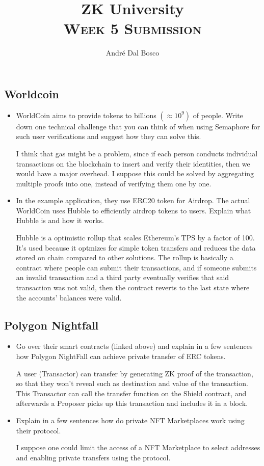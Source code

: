 \documentclass{article}
\title{ZK University \\[4pt] \normalsize\textsc{Week 5 Submission}}
\author{André Dal Bosco \\ \small{\email \quad \discord}}
\begin{document}
\maketitle

\subsection*{Worldcoin}
\begin{itemize}
    \item WorldCoin aims to provide tokens to billions $(\approx\!10^9)$ of people. Write down one technical challenge that you can think of when using Semaphore for such user verifications and suggest how they can solve this. \par I think that gas might be a problem, since if each person conducts individual transactions on the blockchain to insert and verify their identities, then we would have a major overhead. I suppose this could be solved by aggregating multiple proofs into one, instead of verifying them one by one.
    \item In the example application, they use ERC20 token for Airdrop. The actual WorldCoin uses Hubble to efficiently airdrop tokens to users. Explain what Hubble is and how it works. \par Hubble is a optimistic rollup that scales Ethereum's TPS by a factor of 100. It's used because it optmizes for simple token transfers and reduces the data stored on chain compared to other solutions. The rollup is basically a contract where people can submit their transactions, and if someone submits an invalid transaction and a third party eventually verifies that said transaction was not valid, then the contract reverts to the last state where the accounts' balances were valid.
\end{itemize}

\subsection*{Polygon Nightfall}
\begin{itemize}
    \item Go over their smart contracts (linked above) and explain in a few sentences how Polygon NightFall can achieve private transfer of ERC tokens. \par A user (Transactor) can transfer by generating ZK proof of the transaction, so that they won't reveal such as destination and value of the transaction. This Transactor can call the transfer function on the Shield contract, and afterwards a Proposer picks up this transaction and includes it in a block.
    \item Explain in a few sentences how do private NFT Marketplaces work using their protocol. \par I suppose one could limit the access of a NFT Marketplace to select addresses and enabling private transfers using the protocol.
\end{itemize}
\end{document}
